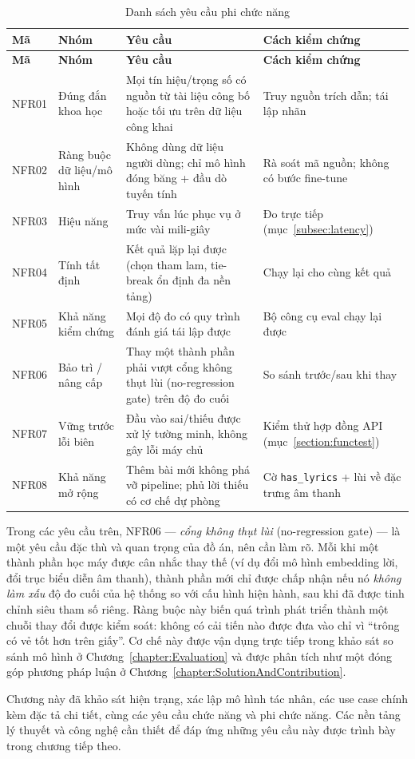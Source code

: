 \documentclass[../DoAn.tex]{subfiles}
\begin{document}
\begin{longtable}{|p{1.4cm}|p{3.2cm}|p{4.2cm}|p{4.0cm}|}
\caption{Danh sách yêu cầu phi chức năng}\label{table:nfr}\\
\hline
\textbf{Mã} & \textbf{Nhóm} & \textbf{Yêu cầu} & \textbf{Cách kiểm chứng} \\
\hline
\endfirsthead
\hline
\textbf{Mã} & \textbf{Nhóm} & \textbf{Yêu cầu} & \textbf{Cách kiểm chứng} \\
\hline
\endhead
NFR01 & Đúng đắn khoa học & Mọi tín hiệu/trọng số có nguồn từ tài liệu công bố hoặc tối ưu trên dữ liệu công khai & Truy nguồn trích dẫn; tái lập nhãn \\
\hline
NFR02 & Ràng buộc dữ liệu/mô hình & Không dùng dữ liệu người dùng; chỉ mô hình đóng băng + đầu dò tuyến tính & Rà soát mã nguồn; không có bước fine-tune \\
\hline
NFR03 & Hiệu năng & Truy vấn lúc phục vụ ở mức vài mili-giây & Đo trực tiếp (mục~\ref{subsec:latency}) \\
\hline
NFR04 & Tính tất định & Kết quả lặp lại được (chọn tham lam, tie-break ổn định đa nền tảng) & Chạy lại cho cùng kết quả \\
\hline
NFR05 & Khả năng kiểm chứng & Mọi độ đo có quy trình đánh giá tái lập được & Bộ công cụ eval chạy lại được \\
\hline
NFR06 & Bảo trì / nâng cấp & Thay một thành phần phải vượt cổng không thụt lùi (no-regression gate) trên độ đo cuối & So sánh trước/sau khi thay \\
\hline
NFR07 & Vững trước lỗi biên & Đầu vào sai/thiếu được xử lý tường minh, không gây lỗi máy chủ & Kiểm thử hợp đồng API (mục~\ref{section:functest}) \\
\hline
NFR08 & Khả năng mở rộng & Thêm bài mới không phá vỡ pipeline; phủ lời thiếu có cơ chế dự phòng & Cờ \texttt{has\_lyrics} + lùi về đặc trưng âm thanh \\
\hline
\end{longtable}

Trong các yêu cầu trên, NFR06 --- \textit{cổng không thụt lùi} (no-regression gate) --- là một yêu cầu đặc thù và quan trọng của đồ án, nên cần làm rõ. Mỗi khi một thành phần học máy được cân nhắc thay thế (ví dụ đổi mô hình embedding lời, đổi trục biểu diễn âm thanh), thành phần mới chỉ được chấp nhận nếu nó \textit{không làm xấu} độ đo cuối của hệ thống so với cấu hình hiện hành, sau khi đã được tinh chỉnh siêu tham số riêng. Ràng buộc này biến quá trình phát triển thành một chuỗi thay đổi được kiểm soát: không có cải tiến nào được đưa vào chỉ vì ``trông có vẻ tốt hơn trên giấy''. Cơ chế này được vận dụng trực tiếp trong khảo sát so sánh mô hình ở Chương~\ref{chapter:Evaluation} và được phân tích như một đóng góp phương pháp luận ở Chương~\ref{chapter:SolutionAndContribution}.

Chương này đã khảo sát hiện trạng, xác lập mô hình tác nhân, các use case chính kèm đặc tả chi tiết, cùng các yêu cầu chức năng và phi chức năng. Các nền tảng lý thuyết và công nghệ cần thiết để đáp ứng những yêu cầu này được trình bày trong chương tiếp theo.
\end{document}
